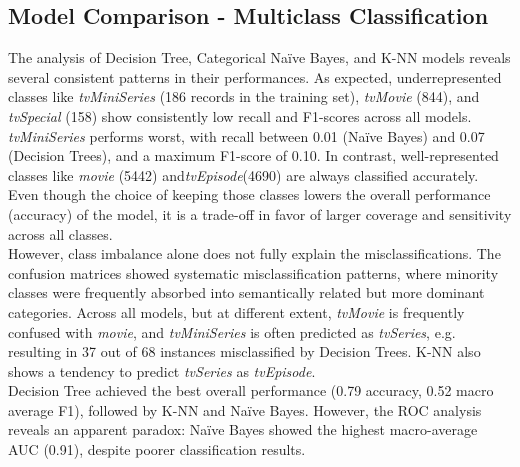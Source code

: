 \subsection{Model Comparison - Multiclass Classification}
The analysis of Decision Tree, Categorical Naïve Bayes, and K-NN models reveals several consistent patterns in their performances. 
As expected, underrepresented classes like  \textit{tvMiniSeries} (186 records in the training set), \textit{tvMovie} (844), and \textit{tvSpecial} (158) show consistently low recall and F1-scores across all models.
\textit{tvMiniSeries} performs worst, with recall between 0.01 (Naïve Bayes) and 0.07 (Decision Trees), and a maximum F1-score of 0.10. 
In contrast, well-represented classes like  \textit{movie} (5442) and\textit{tvEpisode}(4690) are always classified accurately. 
Even though the choice of keeping those classes lowers the overall performance (accuracy) of the model, 
it is a trade-off in favor of larger coverage and sensitivity across all classes.\\
However, class imbalance alone does not fully explain the misclassifications. The confusion matrices showed systematic misclassification patterns, 
where minority classes were frequently absorbed into semantically related but more dominant categories. 
Across all models, but at different extent, \textit{tvMovie} is frequently confused with \textit{movie}, and \textit{tvMiniSeries} is often predicted as \textit{tvSeries}, e.g. resulting in 37 out of 68 instances misclassified by Decision Trees.
K-NN also shows a tendency to predict \textit{tvSeries} as \textit{tvEpisode}.\\
Decision Tree achieved the best overall performance (0.79 accuracy, 0.52 macro average F1), followed by K-NN and Naïve Bayes. 
However, the ROC analysis reveals an apparent paradox: Naïve Bayes showed the highest macro-average AUC (0.91), despite poorer classification results.

